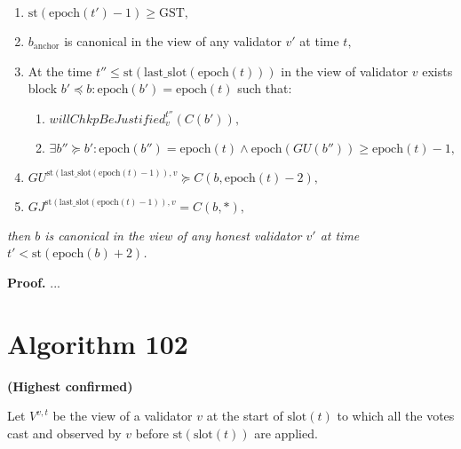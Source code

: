 \documentclass{article}
\begin{document}
\begin{enumerate}
    \item $\text{st}(\text{epoch}(t') - 1) \geq \text{GST},$
    \item $b_{\text{anchor}}$ is canonical in the view of any validator $v'$ at time $t,$
    \item At the time $t'' \leq \text{st}(\text{last\_slot}(\text{epoch}(t)))$ in the view of validator $v$ exists block $b' \preceq b : \text{epoch}(b') = \text{epoch}(t)$ such that:
    \begin{enumerate}
        \item $willChkpBeJustified^{t''}_v(C(b')),$
        \item $\exists b'' \succeq b' : \text{epoch}(b'') = \text{epoch}(t) \wedge \text{epoch}(GU(b'')) \geq \text{epoch}(t) - 1,$
    \end{enumerate}
    \item $GU^{\text{st}(\text{last\_slot}(\text{epoch}(t) - 1)),v} \succeq C(b, \text{epoch}(t) - 2),$
    \item $GJ^{\text{st}(\text{last\_slot}(\text{epoch}(t) - 1)),v} = C(b, *),$
\end{enumerate}

\textit{then $b$ is canonical in the view of any honest validator $v'$ at time $t' < \text{st}(\text{epoch}(b) + 2)$.}

\textbf{Proof.}
...

\section*{Algorithm 102}
\textbf{(Highest confirmed)}

Let $V^{v,t}$ be the view of a validator $v$ at the start of $\text{slot}(t)$ to which all the votes cast and observed by $v$ before $\text{st}(\text{slot}(t))$ are applied.
\end{document}
